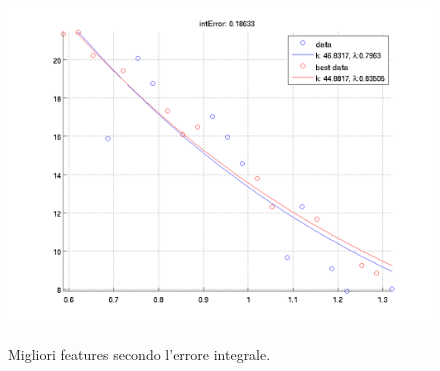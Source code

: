 \documentclass[12pt]{report}
\begin{document}
\begin{figure}[H]
\begin{minipage}[t]{0.5\linewidth}
	\includegraphics[scale=\imFeatBW]{images/best6}\\
\end{minipage}
\caption[short]{Migliori features secondo l'errore integrale.}
\label{fig:bestIntErr}
\end{figure}
\end{document}

